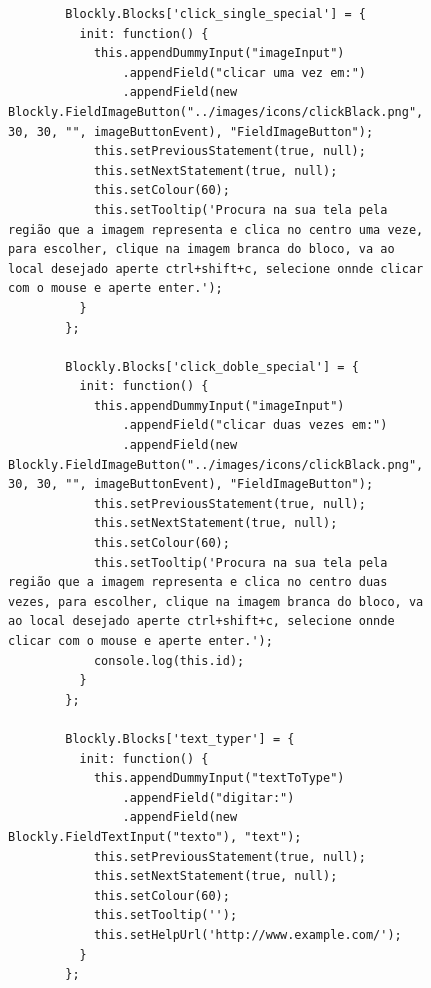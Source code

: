 \documentclass[tg]{mdtufsm}
\begin{document}
    \begin{figure}[!htb]
    \begin{lstlisting}
        Blockly.Blocks['click_single_special'] = {
          init: function() {
            this.appendDummyInput("imageInput")
                .appendField("clicar uma vez em:")
                .appendField(new Blockly.FieldImageButton("../images/icons/clickBlack.png", 30, 30, "", imageButtonEvent), "FieldImageButton");
            this.setPreviousStatement(true, null);
            this.setNextStatement(true, null);
            this.setColour(60);
            this.setTooltip('Procura na sua tela pela região que a imagem representa e clica no centro uma veze, para escolher, clique na imagem branca do bloco, va ao local desejado aperte ctrl+shift+c, selecione onnde clicar com o mouse e aperte enter.');
          }
        };

        Blockly.Blocks['click_doble_special'] = {
          init: function() {
            this.appendDummyInput("imageInput")
                .appendField("clicar duas vezes em:")
                .appendField(new Blockly.FieldImageButton("../images/icons/clickBlack.png", 30, 30, "", imageButtonEvent), "FieldImageButton");
            this.setPreviousStatement(true, null);
            this.setNextStatement(true, null);
            this.setColour(60);
            this.setTooltip('Procura na sua tela pela região que a imagem representa e clica no centro duas vezes, para escolher, clique na imagem branca do bloco, va ao local desejado aperte ctrl+shift+c, selecione onnde clicar com o mouse e aperte enter.');
            console.log(this.id);
          }
        };

        Blockly.Blocks['text_typer'] = {
          init: function() {
            this.appendDummyInput("textToType")
                .appendField("digitar:")
                .appendField(new Blockly.FieldTextInput("texto"), "text");
            this.setPreviousStatement(true, null);
            this.setNextStatement(true, null);
            this.setColour(60);
            this.setTooltip('');
            this.setHelpUrl('http://www.example.com/');
          }
        };


\end{lstlisting}
\end{figure}
\end{document}
